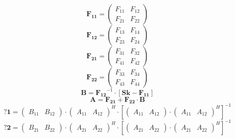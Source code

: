 \[ \mathbf{F_{11}} = \left(\begin{smallmatrix} F_{11} & F_{12} \\
F_{21} & F_{22} \end{smallmatrix}\right) \]
\[ \mathbf{F_{12}} = \left(\begin{smallmatrix} F_{13} & F_{14} \\
F_{23} & F_{24} \end{smallmatrix}\right) \]
\[ \mathbf{F_{21}} = \left(\begin{smallmatrix} F_{31} & F_{32} \\
F_{41} & F_{42} \end{smallmatrix}\right) \]
\[ \mathbf{F_{22}} = \left(\begin{smallmatrix} F_{33} & F_{34} \\
F_{43} & F_{44} \end{smallmatrix}\right) \]
\[ \mathbf{B}=\mathbf{F_{12}}^{-1}\cdot\left[ \mathbf{Sk} -
\mathbf{F_{11}} \right]  \]
\[ \mathbf{A}=\mathbf{F_{21}}+ \mathbf{F_{22}}\cdot\mathbf{B} \]
\[ \mathbf{?1}= \left(\begin{smallmatrix} B_{11} & B_{12}
\end{smallmatrix}\right)\cdot \left(\begin{smallmatrix} A_{11} &
A_{12} \end{smallmatrix}\right)^H \cdot \left[
\left(\begin{smallmatrix} A_{11} & A_{12}
\end{smallmatrix}\right)\cdot\left(\begin{smallmatrix} A_{11} & A_{12}
\end{smallmatrix}\right)^H \right]^{-1} \]
\[ \mathbf{?2}= \left(\begin{smallmatrix} B_{21} & B_{22}
\end{smallmatrix}\right)\cdot \left(\begin{smallmatrix} A_{21} &
A_{22} \end{smallmatrix}\right)^H \cdot \left[
\left(\begin{smallmatrix} A_{21} & A_{22}
\end{smallmatrix}\right)\cdot\left(\begin{smallmatrix} A_{21} & A_{22}
\end{smallmatrix}\right)^H \right]^{-1} \]
